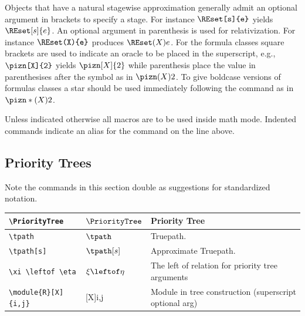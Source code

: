 \documentclass[leqno,11pt]{amsart}
\begin{document}
Objects that have a natural stagewise approximation generally admit an optional argument in brackets to specify a stage.  For instance \( \verb=\REset[s]{e}= \) yields \( \REset[s]{e} \). An optional argument in parenthesis is used for relativization.  For instance \( \verb=\REset(X){e}= \) produces \( \REset(X){e} \).  For the formula classes square brackets are used to indicate an oracle to be placed in the superscript, e.g.,  \( \verb=\pizn[X]{2}= \) yields \( \pizn[X]{2} \) while parenthesis place the value in parenthesises after the symbol as in \( \pizn(X){2} \).  To give boldcase versions of formulas classes a star should be used immediately following the command as in \( \pizn*(X){2} \).

Unless indicated otherwise all macros are to be used inside math mode.  Indented commands indicate an alias for the command on the line above. 


\subsection{Priority Trees}

Note the commands in this section double as suggestions for standardized notation.  

\begin{xtabular}{l |  l | l}\toprule
	\verb=\PriorityTree=					& \( 	\PriorityTree                   \)	& Priority Tree \\ \midrule
	\verb=\tpath=					& \(  \tpath                   \)	& Truepath. \\ \midrule
	\verb=\tpath[s]=					& \( 	\tpath[s]                   \)	& Approximate Truepath. \\ \midrule
	\verb=\xi \leftof \eta =					& \( 	\xi \leftof \eta                   \)	& The left of relation for priority tree arguments \\ \midrule
	\verb=\module{R}[X]{i,j}=					&  [X]{i,j}  & Module in tree construction (superscript optional arg) \\ \midrule
	\end{xtabular}          \\


\end{document}
